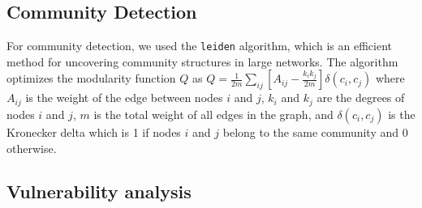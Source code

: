 \documentclass[9pt,twocolumn,twoside]{pnas-report}
\begin{document}
\subsection*{Community Detection} For community detection, we used the \texttt{leiden} algorithm, which is an efficient method for uncovering community structures in large networks.
The algorithm optimizes the modularity function $ Q $ as $
	Q = \frac{1}{2m} \sum_{ij} \left[ A_{ij} - \frac{k_i k_j}{2m} \right] \delta(c_i, c_j)
$
where \( A_{ij} \) is the weight of the edge between nodes \( i \) and \( j \), \( k_i \) and \( k_j \) are the degrees of nodes \( i \) and \( j \), \( m \) is the total weight of all edges in the graph, and \( \delta(c_i, c_j) \) is the Kronecker delta which is 1 if nodes \( i \) and \( j \) belong to the same community and 0 otherwise.

\subsection*{Vulnerability analysis}

\normalsize




\end{document}
